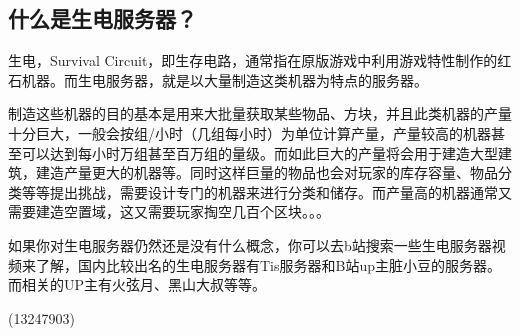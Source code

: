 \documentclass[UTF8,a4paper]{article}
\begin{document}
		\subsection{什么是生电服务器？}
			\par 生电，Survival Circuit，即生存电路，通常指在原版游戏中利用游戏特性制作的红石机器。而生电服务器，就是以大量制造这类机器为特点的服务器。
			\par 制造这些机器的目的基本是用来大批量获取某些物品、方块，并且此类机器的产量十分巨大，一般会按组/小时（几组每小时）为单位计算产量，产量较高的机器甚至可以达到每小时万组甚至百万组的量级。而如此巨大的产量将会用于建造大型建筑，建造产量更大的机器等。同时这样巨量的物品也会对玩家的库存容量、物品分类等等提出挑战，需要设计专门的机器来进行分类和储存。而产量高的机器通常又需要建造空置域，这又需要玩家掏空几百个区块。。。
			\par 如果你对生电服务器仍然还是没有什么概念，你可以去b站搜索一些生电服务器视频来了解，国内比较出名的生电服务器有Tis服务器和B站up主脏小豆的服务器。而相关的UP主有火弦月、黑山大叔等等。
			\begin{flushright}(13247903)\end{flushright}
\end{document}
